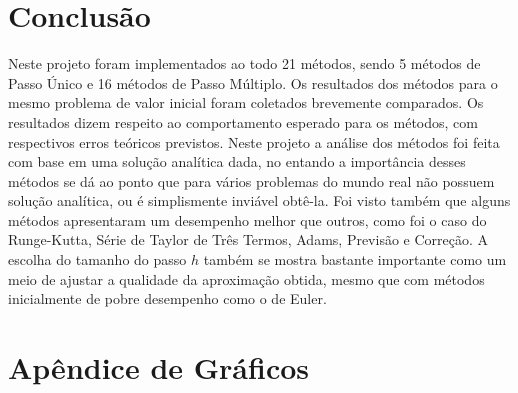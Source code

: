 \documentclass[a4paper]{article}
\begin{document}
\section{Conclusão}


Neste projeto foram implementados ao todo 21 métodos, sendo 5 métodos de Passo Único e 16 métodos de Passo Múltiplo. Os resultados dos métodos para o mesmo problema de valor inicial foram coletados brevemente comparados. Os resultados dizem respeito ao comportamento esperado para os métodos, com respectivos erros teóricos previstos. Neste projeto a análise dos métodos foi feita com base em uma solução analítica dada, no entando a importância desses métodos se dá ao ponto que para vários problemas do mundo real não possuem solução analítica, ou é simplismente inviável obtê-la. Foi visto também que alguns métodos apresentaram um desempenho melhor que outros, como foi o caso do Runge-Kutta, Série de Taylor de Três Termos, Adams, Previsão e Correção. A escolha do tamanho do passo $h$ também se mostra bastante importante como um meio de ajustar a qualidade da aproximação obtida, mesmo que com métodos inicialmente de pobre desempenho como o de Euler.

\section{Apêndice de Gráficos}
\end{document}
